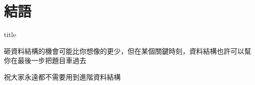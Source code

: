 \section*{結語}

\begin{frame}
    \vfill
    \centering
    \begin{beamercolorbox}[sep=6pt,center,shadow=true,rounded=true]{title}
      \LARGE\insertsectionhead\par
    \end{beamercolorbox}
    \vfill
\end{frame}

\begin{frame}{\ebtitle}
    砸資料結構的機會可能比你想像的更少，但在某個關鍵時刻，資料結構也許可以幫你在最後一步把題目車過去
\end{frame}

\begin{frame}{\ebtitle}
    祝大家永遠都不需要用到進階資料結構
\end{frame}
